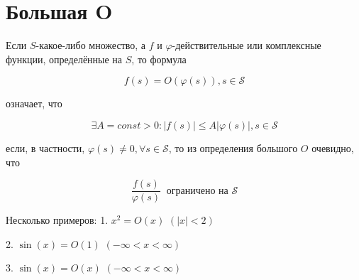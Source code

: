 \documentclass{report}
\begin{document}
\section{Большая O}
Если $S$-какое-либо множество, а $f$ и $\varphi$-действительные или комплексные функции, определённые на $S$, то формула
\begin{center}
\[f(s)=O(\varphi(s)),   s\in\mathcal{S}\]
\end{center}
означает, что 
\begin{center}
    \[\exists A = const>0: |f(s)|\leq A|\varphi(s)|,   s\in\mathcal{S}\]
\end{center}
если, в частности, $\varphi(s)\neq{0}, \forall{s\in\mathcal{S}}$, то из определения большого $O$ очевидно, что
\begin{center}
\[\frac{f(s)}{\varphi(s)}\ \textrm{ ограничено на } \mathcal{S}\]
\end{center}
Несколько примеров:
1. $x^{2} = O(x)$ $(|x|<2)$
\begin{center}
\end{center}
2. $\sin(x) = O(1)$ $(-\infty<x<\infty)$
\begin{center}
\end{center}
3. $\sin(x) = O(x)$ $(-\infty<x<\infty)$
\begin{center}
\end{center}
\end{document}
